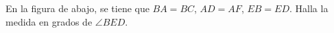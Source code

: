 En la figura de abajo, se tiene que $BA = BC$, $AD = AF$, $EB = ED$. Halla la medida en grados de $\angle BED$.